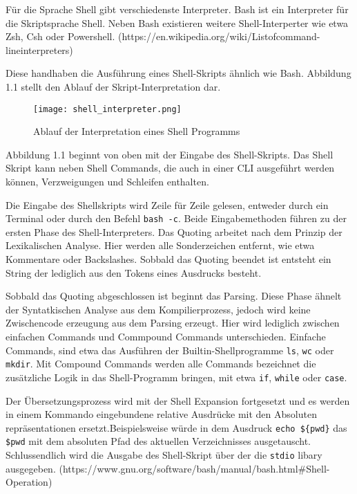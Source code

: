 Für die Sprache Shell gibt verschiedenste Interpreter. Bash ist ein Interpreter für die Skriptsprache Shell. Neben Bash existieren weitere Shell-Interperter wie etwa Zsh, Csh oder Powershell. (https://en.wikipedia.org/wiki/Listofcommand-lineinterpreters)

Diese handhaben die Ausführung eines Shell-Skripts ähnlich wie Bash. Abbildung 1.1 stellt den Ablauf der Skript-Interpretation dar.

\begin{figure}[h]
  \centering
  \caption{Ablauf der Interpretation eines Shell Programms}
  \texttt{[image: shell\_interpreter.png]}
  \label{fig:shell}
\end{figure}
\pagebreak

Abbildung 1.1 beginnt von oben mit der Eingabe des Shell-Skripts. Das Shell Skript kann neben Shell Commands, die auch in einer CLI ausgeführt werden können, Verzweigungen und Schleifen enthalten. 

Die Eingabe des Shellskripts wird Zeile für Zeile gelesen, entweder durch ein Terminal oder durch den Befehl \verb+bash -c+. 
Beide Eingabemethoden führen zu der ersten Phase des Shell-Interpreters. 
Das Quoting arbeitet nach dem Prinzip der Lexikalischen Analyse. Hier werden alle Sonderzeichen entfernt, wie etwa Kommentare oder Backslashes. Sobbald das Quoting beendet ist entsteht ein String der lediglich aus den Tokens eines Ausdrucks besteht. 
 
Sobbald das Quoting abgeschlossen ist beginnt das Parsing. Diese Phase ähnelt der Syntatkischen Analyse aus dem Kompilierprozess, jedoch wird keine Zwischencode erzeugung aus dem Parsing erzeugt. Hier wird lediglich zwischen einfachen Commands und Commpound Commands unterschieden. 
Einfache Commands, sind etwa das Ausführen der Builtin-Shellprogramme \verb+ls+, \verb+wc+ oder \verb+mkdir+. Mit Compound Commands werden alle Commands bezeichnet die zusätzliche Logik in das Shell-Programm bringen, mit etwa \verb+if+, \verb+while+ oder \verb+case+.  

Der Übersetzungsprozess wird mit der Shell Expansion fortgesetzt und es werden in einem Kommando eingebundene relative Ausdrücke mit den Absoluten repräsentationen ersetzt.Beispielsweise würde in dem Ausdruck  \verb+echo ${pwd}+ das \verb+$pwd+ mit dem absoluten Pfad des aktuellen Verzeichnisses ausgetauscht.
Schlussendlich wird die Ausgabe des Shell-Skript über der die \verb+stdio+ libary ausgegeben. 
(https://www.gnu.org/software/bash/manual/bash.html#Shell-Operation)

